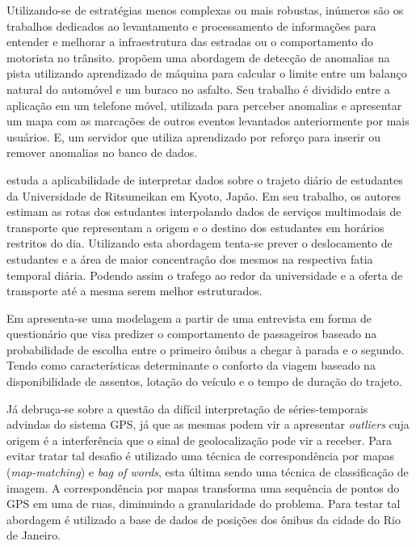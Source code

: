 \documentclass[12pt]{report} %
\begin{document}
Utilizando-se de estratégias menos complexas ou mais robustas, inúmeros são os trabalhos dedicados ao levantamento e processamento de informações para entender e melhorar a infraestrutura das estradas ou o comportamento do motorista no trânsito. \citep{gawad2016dynamic} propõem uma abordagem de detecção de anomalias na pista utilizando aprendizado de máquina para calcular o limite entre um balanço natural do automóvel e um buraco no asfalto. Seu trabalho é dividido entre a aplicação em um telefone móvel, utilizada para perceber anomalias e apresentar um mapa com as marcações de outros eventos levantados anteriormente por mais usuários. E, um servidor que utiliza aprendizado por reforço para inserir ou remover anomalias no banco de dados. 

\citep{HANAOKA2014274} estuda a aplicabilidade de interpretar dados sobre o trajeto diário de estudantes da Universidade de Ritsumeikan em Kyoto, Japão. Em seu trabalho, os autores estimam as rotas dos estudantes interpolando dados de serviços multimodais de transporte que representam a origem e o destino dos estudantes em horários restritos do dia. Utilizando esta abordagem tenta-se prever o deslocamento de estudantes e a área de maior concentração dos mesmos na respectiva fatia temporal diária. Podendo assim o trafego ao redor da universidade e a oferta de transporte até a mesma serem melhor estruturados.

Em \citep{kim2009passenger} apresenta-se uma modelagem a partir de uma entrevista em forma de questionário que visa predizer o comportamento de passageiros baseado na probabilidade de escolha entre o primeiro ônibus a chegar à parada e o segundo. Tendo como características determinante o conforto da viagem baseado na disponibilidade de assentos, lotação do veículo e o tempo de duração do trajeto.

Já \citep{raymond2016} debruça-se sobre a questão da difícil interpretação de séries-temporais advindas do sistema GPS, já que as mesmas podem vir a apresentar \textit{outliers} cuja origem é a interferência que o sinal de geolocalização pode vir a receber. Para evitar tratar tal desafio é utilizado uma técnica de correspondência por mapas (\textit{map-matching}) e \textit{bag of words}, esta última sendo uma técnica de classificação de imagem. A correspondência por mapas transforma uma sequência de pontos do GPS em uma de ruas, diminuindo a granularidade do problema. Para testar tal abordagem é utilizado a base de dados de posições dos ônibus da cidade do Rio de Janeiro. 
\end{document}
